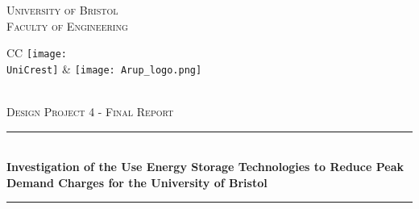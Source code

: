 \documentclass[fontsize=9.5pt]{extarticle}
\newcommand{\AssignmentTitle}{Investigation of the Use Energy Storage Technologies to Reduce Peak Demand Charges for the University of Bristol}
\newcommand{\ModuleTitle}{Design Project 4 - Final Report}
\newcommand{\University}{University of Bristol}
\newcommand{\Faculty}{Faculty of Engineering}
\newcommand{\UniCrest}{crestbris.png}
\newcommand{\horrule}[1]{\rule{\linewidth}{#1}}
\begin{document}
  \setlength{\abovedisplayskip}{-18pt}
  \setlength{\belowdisplayskip}{0pt}
  \setlength{\abovedisplayshortskip}{-18pt}
  \setlength{\belowdisplayshortskip}{0pt}



\begin{titlepage}

	\center %
		\normalfont \normalsize \textsc{\University} \\ [10pt]
		\normalfont \normalsize \textsc{\Faculty} \\ [25pt]
\begin{tabular}{CC}
  \texttt{[image: \\UniCrest]} &   \texttt{[image: Arup\_logo.png]}
\end{tabular}\\[0.5cm]
		\normalfont \normalsize \textsc{\ModuleTitle} \\ [25pt]
		\horrule{0.5pt} \\[0.4cm]
		\huge \textbf{\AssignmentTitle} \\
		\horrule{2pt} \\[0.5cm]

\end{titlepage}
\end{document}
